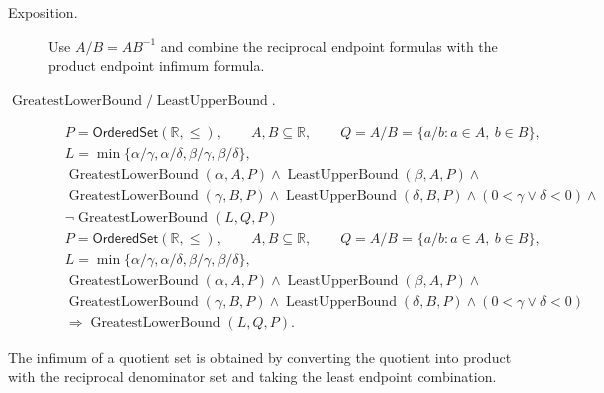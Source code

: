 \begin{remark*}
\begin{description}
  \item[Exposition.]
Use $A/B=A B^{-1}$ and combine the reciprocal endpoint formulas with the
product endpoint infimum formula.


  \item[\(\operatorname{GreatestLowerBound} / \operatorname{LeastUpperBound}.\)]

\[
\begin{aligned}
&P=\mathsf{OrderedSet}(\mathbb{R},\leq),\qquad
A,B\subseteq\mathbb{R},\qquad Q=A/B=\{a/b:a\in A,\ b\in B\},\\
&L=\min\{\alpha/\gamma,\alpha/\delta,\beta/\gamma,\beta/\delta\},\\
&\operatorname{GreatestLowerBound}(\alpha,A,P)\land
\operatorname{LeastUpperBound}(\beta,A,P)\land\\
&\operatorname{GreatestLowerBound}(\gamma,B,P)\land
\operatorname{LeastUpperBound}(\delta,B,P)\land
(0<\gamma\lor\delta<0)\land\\
&\neg\operatorname{GreatestLowerBound}(L,Q,P)
\end{aligned}
\]
\[
\begin{aligned}
&P=\mathsf{OrderedSet}(\mathbb{R},\leq),\qquad
A,B\subseteq\mathbb{R},\qquad Q=A/B=\{a/b:a\in A,\ b\in B\},\\
&L=\min\{\alpha/\gamma,\alpha/\delta,\beta/\gamma,\beta/\delta\},\\
&\operatorname{GreatestLowerBound}(\alpha,A,P)\land
\operatorname{LeastUpperBound}(\beta,A,P)\land\\
&\operatorname{GreatestLowerBound}(\gamma,B,P)\land
\operatorname{LeastUpperBound}(\delta,B,P)\land
(0<\gamma\lor\delta<0)\\
&\Longrightarrow \operatorname{GreatestLowerBound}(L,Q,P).
\end{aligned}
\]
\end{description}
\end{remark*}

\begin{remark*}[Interpretation]
The infimum of a quotient set is obtained by converting the quotient into
product with the reciprocal denominator set and taking the least endpoint
combination.
\end{remark*}

